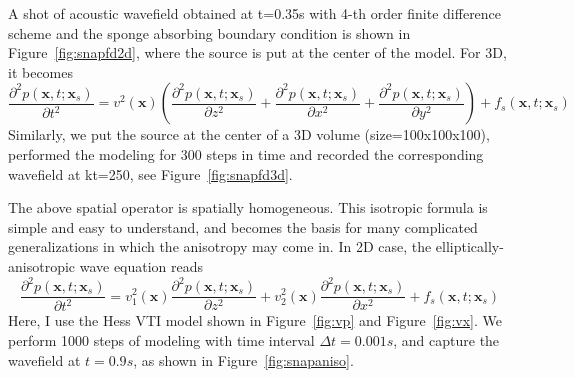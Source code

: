 A shot of acoustic wavefield obtained at t=0.35s with 4-th order finite difference scheme and the sponge absorbing boundary condition is shown in Figure~\ref{fig:snapfd2d}, where the source is put at the center of the model. For 3D, it becomes
\begin{equation}
 \frac{\partial^2 p(\textbf{x},t;\textbf{x}_s)}{\partial t^2}
 =v^2(\textbf{x})\left(\frac{\partial^2 p(\textbf{x},t;\textbf{x}_s) }{\partial z^2}  
 +\frac{\partial^2 p(\textbf{x},t;\textbf{x}_s)}{\partial x^2}
 +\frac{\partial^2 p(\textbf{x},t;\textbf{x}_s)}{\partial y^2}\right)+f_s(\textbf{x},t;\textbf{x}_s)
\end{equation}
Similarly, we put the source at the center of a 3D volume (size=100x100x100), performed the modeling for 300 steps in time and recorded the corresponding wavefield at kt=250, see Figure~\ref{fig:snapfd3d}.

% 
% 
% 





The above spatial operator is spatially homogeneous. This isotropic formula is simple and  easy to understand, and becomes the basis for many complicated generalizations in which the anisotropy may come in. In 2D case, the elliptically-anisotropic wave equation reads
\begin{equation}
 \frac{\partial^2 p(\textbf{x},t;\textbf{x}_s)}{\partial t^2}
 =v_1^2(\textbf{x})\frac{\partial^2 p(\textbf{x},t;\textbf{x}_s) }{\partial z^2} 
 +v_2^2(\textbf{x})\frac{\partial^2 p(\textbf{x},t;\textbf{x}_s)}{\partial x^2}+f_s(\textbf{x},t;\textbf{x}_s)
\end{equation}
Here, I use the Hess VTI model shown in Figure~\ref{fig:vp} and Figure~\ref{fig:vx}. We perform 1000 steps of modeling with time interval $\Delta t=0.001s$, and capture the wavefield at $t=0.9s$, as shown in Figure~\ref{fig:snapaniso}. 


